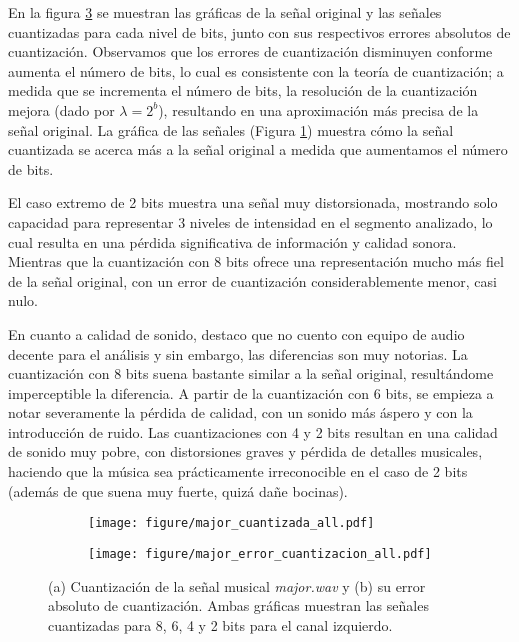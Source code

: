 \documentclass[paper=letter, fontsize=11pt, draft=false]{scrartcl}
\numberwithin{equation}{problemcounter} %
\numberwithin{figure}{problemcounter} %
\numberwithin{table}{problemcounter} %
\numberwithin{subsection}{problemcounter}
\begin{document}
En la figura \ref{fig:major} se muestran las gráficas de la señal original y las señales cuantizadas para cada nivel de bits, junto con sus respectivos errores absolutos de cuantización. Observamos que los errores de cuantización disminuyen conforme aumenta el número de bits, lo cual es consistente con la teoría de cuantización; a medida que se incrementa el número de bits, la resolución de la cuantización mejora (dado por $\lambda = 2^b$), resultando en una aproximación más precisa de la señal original. La gráfica de las señales (Figura \ref{fig:major_a}) muestra cómo la señal cuantizada se acerca más a la señal original a medida que aumentamos el número de bits.

El caso extremo de 2 bits muestra una señal muy distorsionada, mostrando solo capacidad para representar 3 niveles de intensidad en el segmento analizado, lo cual resulta en una pérdida significativa de información y calidad sonora. Mientras que la cuantización con 8 bits ofrece una representación mucho más fiel de la señal original, con un error de cuantización considerablemente menor, casi nulo.

En cuanto a calidad de sonido, destaco que no cuento con equipo de audio decente para el análisis y sin embargo, las diferencias son muy notorias. La cuantización con 8 bits suena bastante similar a la señal original, resultándome imperceptible la diferencia. A partir de la cuantización con 6 bits, se empieza a notar severamente la pérdida de calidad, con un sonido más áspero y con la introducción de ruido. Las cuantizaciones con 4 y 2 bits resultan en una calidad de sonido muy pobre, con distorsiones graves y pérdida de detalles musicales, haciendo que la música sea prácticamente irreconocible en el caso de 2 bits (además de que suena muy fuerte, quizá dañe bocinas).


\begin{figure}
    \centering
    \begin{subfigure}[b]{\linewidth}
        \centering
        \texttt{[image: figure/major\_cuantizada\_all.pdf]}
        \caption{}
        \label{fig:major_a}
    \end{subfigure}
    \vspace{0.5cm}
    \begin{subfigure}[b]{\linewidth}
        \centering
        \texttt{[image: figure/major\_error\_cuantizacion\_all.pdf]}
        \caption{}
        \label{fig:major_b}
    \end{subfigure}
    \caption{(a) Cuantización de la señal musical \textit{major.wav} y (b) su error absoluto de cuantización. Ambas gráficas muestran las señales cuantizadas para 8, 6, 4 y 2 bits para el canal izquierdo.}
    \label{fig:major}
\end{figure}
\end{document}
